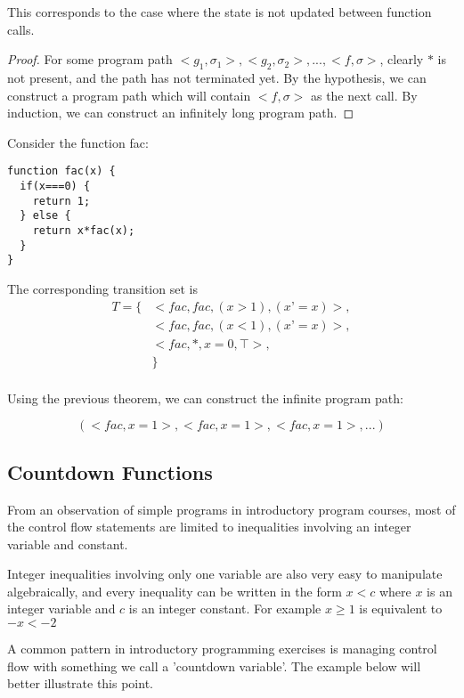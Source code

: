 This corresponds to the case where the state is not updated between function calls.

\begin{proof}
  For some program path $<g_1,\sigma_1>, <g_2,\sigma_2>,..., <f,\sigma>$, clearly $*$ is not present, and the path has not terminated yet.
  By the hypothesis, we can construct a program path which will contain $<f,\sigma>$ as the next call. By induction, we can construct an infinitely long program path.
\end{proof}

\begin{example}
  Consider the function fac:
\begin{lstlisting}
function fac(x) {
  if(x===0) {
    return 1;
  } else {
    return x*fac(x);
  }
}
\end{lstlisting}

The corresponding transition set is
\[
 \begin{aligned}
T = \{ &< fac, fac, (x>1), (x’=x) >, \\
   & < fac, fac, (x<1), (x’=x) >, \\
   & < fac, *, x=0, \top >, \\
   & \} \\
\end{aligned}
\]

Using the previous theorem, we can construct the infinite program path:

\[(<fac, x=1>, <fac, x=1>, <fac, x=1>, ...)\]

\end{example}


\subsection{Countdown Functions}
From an observation of simple programs in introductory program courses, most of the control flow statements are limited to inequalities involving an integer variable and constant.

Integer inequalities involving only one variable are also very easy to manipulate algebraically, and every inequality can be written in the form $x < c$ where $x$ is an integer variable and $c$ is an integer constant. For example $x\geq 1$ is equivalent to $-x < -2$

A common pattern in introductory programming exercises is managing control flow with something we call a 'countdown variable'. The example below will better illustrate this point.

